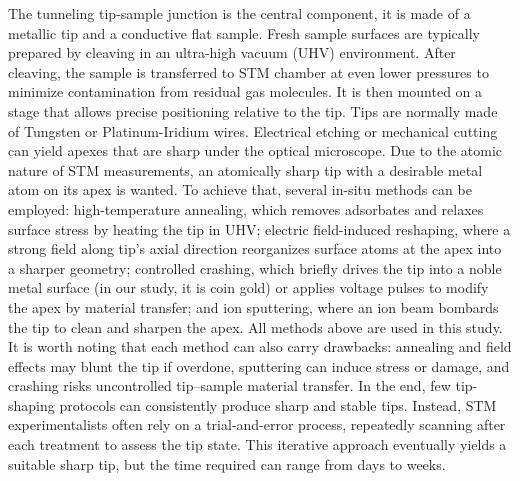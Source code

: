 The tunneling tip-sample junction is the central component, it is made of a metallic tip and a conductive flat sample. Fresh sample surfaces are typically prepared by cleaving in an ultra-high vacuum (UHV) environment. After cleaving, the sample is transferred to STM chamber at even lower pressures to minimize contamination from residual gas molecules. It is then mounted on a stage that allows precise positioning relative to the tip. Tips are normally made of Tungsten or Platinum-Iridium wires. Electrical etching or mechanical cutting can yield apexes that are sharp under the optical microscope. Due to the atomic nature of \ac{STM} measurements, an atomically sharp tip with a desirable metal atom on its apex is wanted. To achieve that, several in-situ methods can be employed: high-temperature annealing, which removes adsorbates and relaxes surface stress by heating the tip in UHV; electric field-induced reshaping, where a strong field along tip's axial direction reorganizes surface atoms at the apex into a sharper geometry; controlled crashing, which briefly drives the tip into a noble metal surface (in our study, it is coin gold) or applies voltage pulses to modify the apex by material transfer; and ion sputtering, where an ion beam bombards the tip to clean and sharpen the apex. All methods above are used in this study. It is worth noting that each method can also carry drawbacks: annealing and field effects may blunt the tip if overdone, sputtering can induce stress or damage, and crashing risks uncontrolled tip–sample material transfer. In the end, few tip-shaping protocols can consistently produce sharp and stable tips. Instead, STM experimentalists often rely on a trial-and-error process, repeatedly scanning after each treatment to assess the tip state. This iterative approach eventually yields a suitable sharp tip, but the time required can range from days to weeks.



